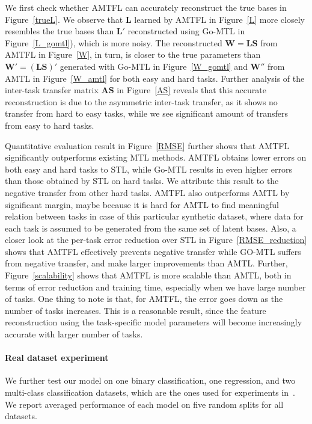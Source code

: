 \documentclass{article}
\newcommand{\mat}[1]{\boldsymbol{#1}} %
\begin{document}
	We first check whether AMTFL can accurately reconstruct the true bases in Figure~\ref{trueL}. We observe that $\mat{L}$ learned by AMTFL in Figure~\ref{L} more closely resembles the true bases than $\mat{L}'$ reconstructed using Go-MTL in Figure~\ref{L_gomtl}), which is more noisy. The reconstructed $\mat{W}=\mat{L}\mat{S}$ from AMTFL in Figure~\ref{W}, in turn, is closer to the true parameters than $\mat{W}'=(\mat{L}\mat{S})'$ generated with Go-MTL in Figure~\ref{W_gomtl} and $\mat{W}''$ from AMTL in Figure~\ref{W_amtl} for both easy and hard tasks. Further analysis of the inter-task transfer matrix $\mat{A}\mat{S}$ in Figure~\ref{AS} reveals that this accurate reconstruction is due to the asymmetric inter-task transfer, as it shows no transfer from hard to easy tasks, while we see significant amount of transfers from easy to hard tasks.
	
	Quantitative evaluation result in Figure~\ref{RMSE} further shows that AMTFL significantly outperforms existing MTL methods. 
	AMTFL obtains lower errors on both easy and hard tasks to STL, while Go-MTL results in even higher errors than those obtained by STL on hard tasks. We attribute this result to the negative transfer from other hard tasks. AMTFL also outperforms AMTL by significant margin, maybe because it is hard for AMTL to find meaningful relation between tasks in case of this particular synthetic dataset, where data for each task is assumed to be generated from the same set of latent bases. Also, a closer look at the per-task error reduction over STL in Figure~\ref{RMSE_reduction} shows that AMTFL effectively prevents negative transfer while GO-MTL suffers from negative transfer, and make larger improvements than AMTL. Further, Figure~\ref{scalability} shows that AMTFL is more scalable than AMTL, both in terms of error reduction and training time, especially when we have large number of tasks. One thing to note is that, for AMTFL, the error goes down as the number of tasks increases. This is a reasonable result, since the feature reconstruction using the task-specific model parameters will become increasingly accurate with larger number of tasks. %
	
	\paragraph{Real dataset experiment}	
	We further test our model on one binary classification, one regression, and two multi-class classification datasets, which are the ones used for experiments in~\cite{go-mtl,amtl}. We report averaged performance of each model on five random splits for all datasets. 
	
\end{document}
